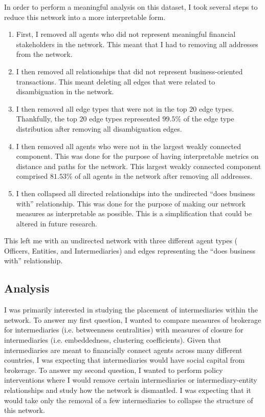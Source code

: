 \documentclass[11pt]{article}
\begin{document}
In order to perform a meaningful analysis on this dataset, I took several steps 
to reduce this network into a more interpretable form. 
\begin{enumerate}[1.]
    \item First,
        I removed all agents who did not represent meaningful financial 
        stakeholders in the network. This meant that I had to removing all 
        addresses from the network. 
    \item I then removed all relationships that did not represent 
        business-oriented transactions. This meant deleting all edges that were
        related to disambiguation in the network.
    \item I then removed all edge types that were not in the top $20$
        edge types. Thankfully, the top $20$ edge types represented 
        $99.5\%$ of the edge type distribution after removing all 
        disambiguation edges. 
    \item I then removed all agents who were not in the largest weakly 
        connected component. This was done for the purpose of having
        interpretable metrics on distance and paths for the network.
        This largest weakly connected component
        comprised $81.53\%$ of all agents in the network after removing all
        addresses.
    \item I then collapsed all directed relationships into the undirected
        ``does business with'' relationship. This was done for the purpose of
        making our network measures as interpretable as possible. This is a
        simplification that could be altered in future research.
\end{enumerate}
This left me with an undirected network with three different agent types (
Officers, Entities, and Intermediaries) and edges representing the 
``does business with'' relationship.

\subsection{Analysis}

I was primarily interested in studying the placement of intermediaries within
the network. To answer my first question, I wanted to compare measures of
brokerage for intermediaries (i.e. betweenness centralities) with measures of
closure for intermediaries (i.e. embeddedness, clustering coefficients). Given
that intermediaries are meant to financially connect agents across many
different countries, I was expecting that intermediaries would have social 
capital from brokerage. To answer my second question, I wanted to perform 
policy interventions where I would remove certain intermediaries or 
intermediary-entity
relationships and study how the network is dismantled. I was expecting that
it would take only the removal of a few intermediaries to collapse the structure
of this network.
\end{document}

